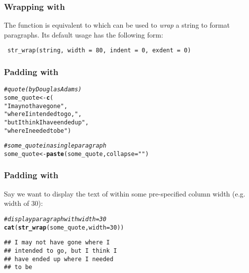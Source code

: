 \documentclass[12pt]{beamer}\usepackage[]{graphicx}\usepackage[]{color}
\makeatletter
\newcommand{\hlnum}[1]{\textcolor[rgb]{0.686,0.059,0.569}{#1}}%
\newcommand{\hlstr}[1]{\textcolor[rgb]{0.192,0.494,0.8}{#1}}%
\newcommand{\hlcom}[1]{\textcolor[rgb]{0.678,0.584,0.686}{\textit{#1}}}%
\newcommand{\hlstd}[1]{\textcolor[rgb]{0.345,0.345,0.345}{#1}}%
\newcommand{\hlkwb}[1]{\textcolor[rgb]{0.69,0.353,0.396}{#1}}%
\newcommand{\hlkwc}[1]{\textcolor[rgb]{0.333,0.667,0.333}{#1}}%
\newcommand{\hlkwd}[1]{\textcolor[rgb]{0.737,0.353,0.396}{\textbf{#1}}}%
\newenvironment{kframe}{%
 \def\at@end@of@kframe{}%
 \ifinner\ifhmode%
  \def\at@end@of@kframe{\end{minipage}}%
  \begin{minipage}{\columnwidth}%
 \fi\fi%
 \def\FrameCommand##1{\hskip\@totalleftmargin \hskip-\fboxsep
 \colorbox{shadecolor}{##1}\hskip-\fboxsep
     \hskip-\linewidth \hskip-\@totalleftmargin \hskip\columnwidth}%
 \MakeFramed {\advance\hsize-\width
   \@totalleftmargin\z@ \linewidth\hsize
   \@setminipage}}%
 {\par\unskip\endMakeFramed%
 \at@end@of@kframe}
\newenvironment{knitrout}{}{} %
\makeatother
\begin{document}

\begin{frame}[fragile]
\frametitle{Wrapping with }

The function  is equivalent to  which can be used to \textit{wrap} a string to format paragraphs.
Its default usage has the following form:
\begin{verbatim}
 str_wrap(string, width = 80, indent = 0, exdent = 0)
\end{verbatim}

\end{frame}


\begin{frame}[fragile]
\frametitle{Padding with }

\begin{knitrout}\footnotesize
{}\color{fgcolor}\begin{kframe}
\begin{alltt}
\hlcom{# quote (by Douglas Adams)}
\hlstd{some_quote} \hlkwb{<-} \hlkwd{c}\hlstd{(}
  \hlstr{"I may not have gone"}\hlstd{,}
  \hlstr{"where I intended to go,"}\hlstd{,}
  \hlstr{"but I think I have ended up"}\hlstd{,}
  \hlstr{"where I needed to be"}\hlstd{)}

\hlcom{# some_quote in a single paragraph}
\hlstd{some_quote} \hlkwb{<-} \hlkwd{paste}\hlstd{(some_quote,} \hlkwc{collapse} \hlstd{=} \hlstr{" "}\hlstd{)}
\end{alltt}
\end{kframe}
\end{knitrout}

\end{frame}


\begin{frame}[fragile]
\frametitle{Padding with }

Say we want to display the text of  within some pre-specified column width (e.g. width of 30):
\begin{knitrout}\footnotesize
{}\color{fgcolor}\begin{kframe}
\begin{alltt}
\hlcom{# display paragraph with width=30}
\hlkwd{cat}\hlstd{(}\hlkwd{str_wrap}\hlstd{(some_quote,} \hlkwc{width} \hlstd{=} \hlnum{30}\hlstd{))}
\end{alltt}
\begin{verbatim}
## I may not have gone where I
## intended to go, but I think I
## have ended up where I needed
## to be
\end{verbatim}
\end{kframe}
\end{knitrout}

\end{frame}
\end{document}

